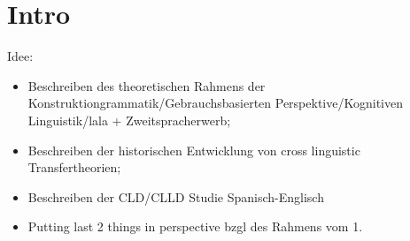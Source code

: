 \section{Intro}

\begin{comment}
* ca 3/4 Seiten
* Untersuchungsgegenstand
* Erkenntnisinteresse
* Forschungsstand
* Vorgehensweise
* Ergebnisse können/sollen angedeuten werden
\end{comment}

Idee:
\begin{itemize}
    \item Beschreiben des theoretischen Rahmens der Konstruktiongrammatik/Gebrauchsbasierten Perspektive/Kognitiven Linguistik/lala + Zweitspracherwerb;
    \item Beschreiben der historischen Entwicklung von cross linguistic Transfertheorien;
    \item Beschreiben der CLD/CLLD Studie Spanisch-Englisch
    \item Putting last 2 things in perspective bzgl des Rahmens vom 1.
\end{itemize}
